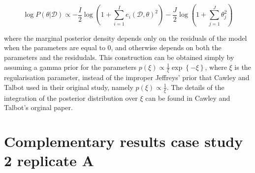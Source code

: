 \documentclass[11pt, oneside]{article}
\begin{document}
\begin{equation}
	\log P(\theta | \mathcal{D}) \propto - \frac{I}{2} \log \left(1 + \sum_{i=1}^{I} e_i(\mathcal{D},\theta)^2\right) - \frac{J}{2} \log \left(1 + \sum_{j=1}^{J} \theta_{j}^2 \right)
\end{equation}

where the marginal posterior density depends only on the residuals of the model when the parameters are equal to 0, and otherwise depends on both the parameters and the residudals. 
This construction can be obtained simply by assuming a gamma prior for the parameters $p(\xi) \propto \frac{1}{\xi} \exp\left\{- \xi \right\}$, where $\xi$ is the regularisation parameter, instead of the improper Jeffreys' prior that Cawley and Talbot used in their original study, namely $p(\xi) \propto \frac{1}{\xi}$. 
The details of the integration of the posterior distribution over $\xi$ can be found in Cawley and Talbot's orginal paper.

\section{Complementary results case study 2 replicate A}
\end{document}
